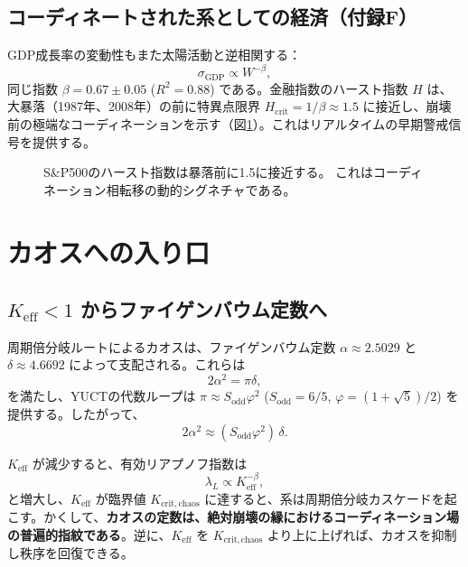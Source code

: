 \documentclass[12pt,a4paper]{article}
\newcommand{\Keff}{K_{\mathrm{eff}}}
\begin{document}
	\subsection{コーディネートされた系としての経済（付録F）}
	
	GDP成長率の変動性もまた太陽活動と逆相関する：
	\[
	\sigma_{\text{GDP}} \propto W^{-\beta},
	\]
	同じ指数 \(\beta = 0.67 \pm 0.05\) (\(R^2 = 0.88\)) である。金融指数のハースト指数 \(H\) は、大暴落（1987年、2008年）の前に特異点限界 \(H_{\text{crit}} = 1/\beta \approx 1.5\) に接近し、崩壊前の極端なコーディネーションを示す（図\ref{fig:hurst}）。これはリアルタイムの早期警戒信号を提供する。
	
	\begin{figure}[H]
		\centering
		\caption{S\&P500のハースト指数は暴落前に1.5に接近する。
			これはコーディネーション相転移の動的シグネチャである。}
		\label{fig:hurst}
	\end{figure}
	
	\section{カオスへの入り口}
	
	\subsection{\(\Keff < 1\) からファイゲンバウム定数へ}
	
	周期倍分岐ルートによるカオスは、ファイゲンバウム定数 \(\alpha \approx 2.5029\) と \(\delta \approx 4.6692\) によって支配される。これらは
	\[
	2\alpha^2 = \pi \delta,
	\]
	を満たし、YUCTの代数ループは \(\pi \approx S_{\mathrm{odd}}\varphi^2\) (\(S_{\mathrm{odd}}=6/5\), \(\varphi = (1+\sqrt{5})/2\)) を提供する。したがって、
	\[
	2\alpha^2 \approx (S_{\mathrm{odd}}\varphi^2)\,\delta.
	\]
	
	\(\Keff\) が減少すると、有効リアプノフ指数は
	\[
	\lambda_L \propto \Keff^{-\beta},
	\]
	と増大し、\(\Keff\) が臨界値 \(K_{\mathrm{crit,chaos}}\) に達すると、系は周期倍分岐カスケードを起こす。かくして、\textbf{カオスの定数は、絶対崩壊の縁におけるコーディネーション場の普遍的指紋である}。逆に、\(\Keff\) を \(K_{\mathrm{crit,chaos}}\) より上に上げれば、カオスを抑制し秩序を回復できる。
	
\end{document}
